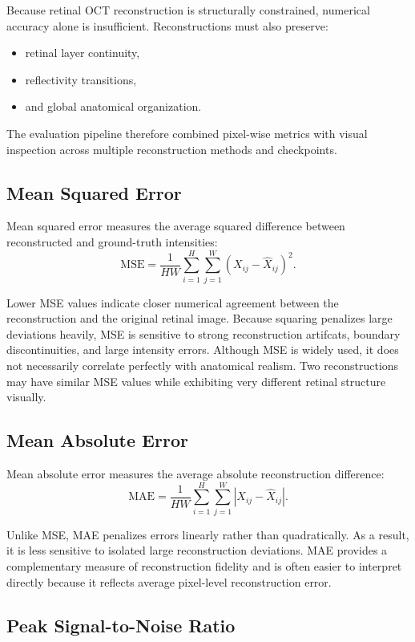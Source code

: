 \documentclass[12pt,oneside]{article}
\begin{document}
Because retinal OCT reconstruction is structurally constrained, numerical accuracy alone is insufficient. Reconstructions must also preserve:
\begin{itemize}
    \item retinal layer continuity,
    \item reflectivity transitions,
    \item and global anatomical organization.
\end{itemize}

The evaluation pipeline therefore combined pixel-wise metrics with visual inspection across multiple reconstruction methods and checkpoints.

\subsection{Mean Squared Error}

Mean squared error measures the average squared difference between reconstructed and ground-truth intensities:
\[
\mathrm{MSE}
=
\frac{1}{HW}
\sum_{i=1}^H
\sum_{j=1}^W
(
X_{ij}-\hat{X}_{ij}
)^2.
\]

Lower MSE values indicate closer numerical agreement between the reconstruction and the original retinal image.
Because squaring penalizes large deviations heavily, MSE is sensitive to strong reconstruction artifcats, boundary discontinuities, and large intensity errors. 
Although MSE is widely used, it does not necessarily correlate perfectly with anatomical realism. Two reconstructions may have similar MSE values while exhibiting very different retinal structure visually.

\subsection{Mean Absolute Error}

Mean absolute error measures the average absolute reconstruction difference:
\[
\mathrm{MAE}
=
\frac{1}{HW}
\sum_{i=1}^H
\sum_{j=1}^W
|X_{ij}-\hat{X}_{ij}|.
\]

Unlike MSE, MAE penalizes errors linearly rather than quadratically. As a result, it is less sensitive to isolated large reconstruction deviations.
MAE provides a complementary measure of reconstruction fidelity and is often easier to interpret directly because it reflects average pixel-level reconstruction error.

\subsection{Peak Signal-to-Noise Ratio}
\end{document}
